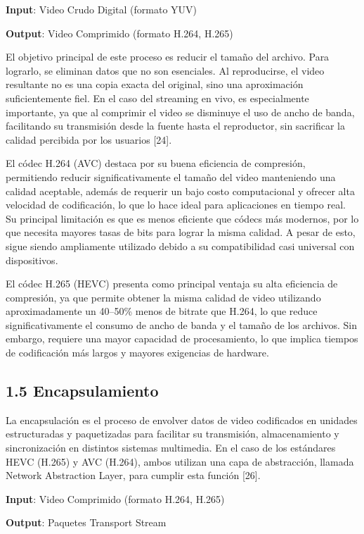 \documentclass[12pt,a4paper]{article}
\begin{document}
\textbf{Input}: Video Crudo Digital (formato YUV)

\textbf{Output}: Video Comprimido (formato H.264, H.265)

El objetivo principal de este proceso es reducir el tamaño del archivo. Para lograrlo, se eliminan datos que no son esenciales. Al reproducirse, el video resultante no es una copia exacta del original, sino una aproximación suficientemente fiel. En el caso del streaming en vivo, es especialmente importante, ya que al comprimir el video se disminuye el uso de ancho de banda, facilitando su transmisión desde la fuente hasta el reproductor, sin sacrificar la calidad percibida por los usuarios {[}24{]}.

El códec H.264 (AVC) destaca por su buena eficiencia de compresión, permitiendo reducir significativamente el tamaño del video manteniendo una calidad aceptable, además de requerir un bajo costo computacional y ofrecer alta velocidad de codificación, lo que lo hace ideal para aplicaciones en tiempo real. Su principal limitación es que es menos eficiente que códecs más modernos, por lo que necesita mayores tasas de bits para lograr la misma calidad. A pesar de esto, sigue siendo ampliamente utilizado debido a su compatibilidad casi universal con dispositivos.

El códec H.265 (HEVC) presenta como principal ventaja su alta eficiencia de compresión, ya que permite obtener la misma calidad de video utilizando aproximadamente un 40--50\% menos de bitrate que H.264, lo que reduce significativamente el consumo de ancho de banda y el tamaño de los archivos. Sin embargo, requiere una mayor capacidad de procesamiento, lo que implica tiempos de codificación más largos y mayores exigencias de hardware.

\subsection{1.5 Encapsulamiento}\label{encapsulamiento}

La encapsulación es el proceso de envolver datos de video codificados en unidades estructuradas y paquetizadas para facilitar su transmisión, almacenamiento y sincronización en distintos sistemas multimedia. En el caso de los estándares HEVC (H.265) y AVC (H.264), ambos utilizan una capa de abstracción, llamada Network Abstraction Layer, para cumplir esta función {[}26{]}.

\textbf{Input}: Video Comprimido (formato H.264, H.265)

\textbf{Output}: Paquetes Transport Stream
\end{document}
